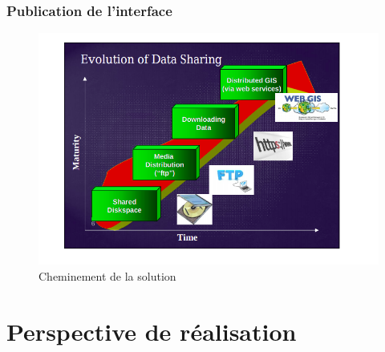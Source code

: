         \subsubsection{Publication de l'interface}
            
    \begin{figure}[t]
        \centering
        \includegraphics[width=1\textwidth]{images/evolution_projetGIS.png}
        \caption{Cheminement de la solution}
    \end{figure}

\section{Perspective de réalisation}
    